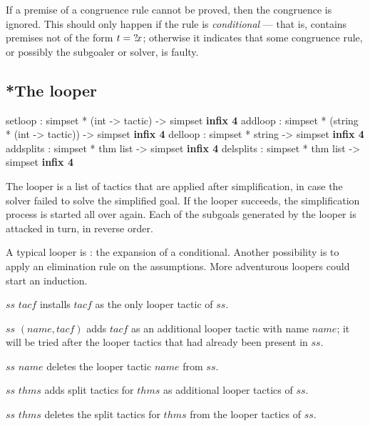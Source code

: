 \medskip

\begin{warn}
  If a premise of a congruence rule cannot be proved, then the
  congruence is ignored.  This should only happen if the rule is
  \emph{conditional} --- that is, contains premises not of the form $t
  = {?\!x}$; otherwise it indicates that some congruence rule, or
  possibly the subgoaler or solver, is faulty.
\end{warn}


\subsection{*The looper}\label{sec:simp-looper}
\begin{ttbox}
setloop   : simpset *           (int -> tactic)  -> simpset \hfill{\bf infix 4}
addloop   : simpset * (string * (int -> tactic)) -> simpset \hfill{\bf infix 4}
delloop   : simpset *  string                    -> simpset \hfill{\bf infix 4}
addsplits : simpset * thm list -> simpset \hfill{\bf infix 4}
delsplits : simpset * thm list -> simpset \hfill{\bf infix 4}
\end{ttbox}

The looper is a list of tactics that are applied after simplification, in case
the solver failed to solve the simplified goal.  If the looper
succeeds, the simplification process is started all over again.  Each
of the subgoals generated by the looper is attacked in turn, in
reverse order.

A typical looper is : the expansion of a conditional.
Another possibility is to apply an elimination rule on the
assumptions.  More adventurous loopers could start an induction.

\begin{ttdescription}
  
\item[$ss$ \ttindexbold{setloop} $tacf$] installs $tacf$ as the only looper
  tactic of $ss$.
  
\item[$ss$ \ttindexbold{addloop} $(name,tacf)$] adds $tacf$ as an additional
  looper tactic with name $name$; it will be tried after the looper tactics
  that had already been present in $ss$.
  
\item[$ss$ \ttindexbold{delloop} $name$] deletes the looper tactic $name$
  from $ss$.
  
\item[$ss$ \ttindexbold{addsplits} $thms$] adds
  split tactics for $thms$ as additional looper tactics of $ss$.

\item[$ss$ \ttindexbold{addsplits} $thms$] deletes the
  split tactics for $thms$ from the looper tactics of $ss$.

\end{ttdescription}

